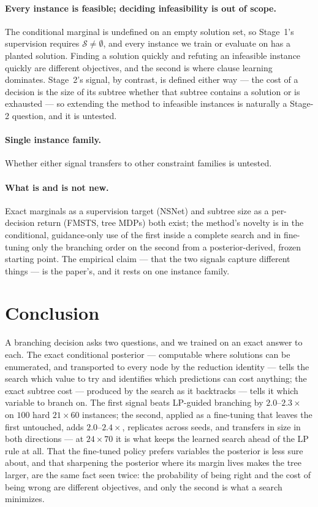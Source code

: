 \documentclass[final,5p,times,twocolumn]{elsarticle}
\newcommand{\SOL}{\mathcal{S}}
\begin{document}
\paragraph{Every instance is feasible; deciding infeasibility is out of scope.} The conditional marginal is undefined on an empty solution set, so Stage~1's supervision requires $\SOL\neq\emptyset$, and every instance we train or evaluate on has a planted solution. Finding a solution quickly and refuting an infeasible instance quickly are different objectives, and the second is where clause learning dominates. Stage~2's signal, by contrast, is defined either way --- the cost of a decision is the size of its subtree whether that subtree contains a solution or is exhausted --- so extending the method to infeasible instances is naturally a Stage-2 question, and it is untested.

\paragraph{Single instance family.} Whether either signal transfers to other constraint families is untested.

\paragraph{What is and is not new.} Exact marginals as a supervision target (NSNet) and subtree size as a per-decision return (FMSTS, tree MDPs) both exist; the method's novelty is in the conditional, guidance-only use of the first inside a complete search and in fine-tuning only the branching order on the second from a posterior-derived, frozen starting point. The empirical claim --- that the two signals capture different things --- is the paper's, and it rests on one instance family.

\section{Conclusion}
\label{sec:conclusion}

A branching decision asks two questions, and we trained on an exact answer to each. The exact conditional posterior --- computable where solutions can be enumerated, and transported to every node by the reduction identity --- tells the search which value to try and identifies which predictions can cost anything; the exact subtree cost --- produced by the search as it backtracks --- tells it which variable to branch on. The first signal beats LP-guided branching by $2.0$--$2.3\times$ on $100$ hard $21\times60$ instances; the second, applied as a fine-tuning that leaves the first untouched, adds $2.0$--$2.4\times$, replicates across seeds, and transfers in size in both directions --- at $24\times70$ it is what keeps the learned search ahead of the LP rule at all. That the fine-tuned policy prefers variables the posterior is less sure about, and that sharpening the posterior where its margin lives makes the tree larger, are the same fact seen twice: the probability of being right and the cost of being wrong are different objectives, and only the second is what a search minimizes.
\end{document}
